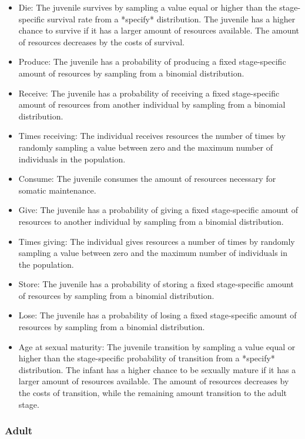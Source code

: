 \documentclass{article}
\begin{document}
\begin{itemize}
    \item Die: The juvenile survives by sampling a value equal or higher than the stage-specific survival rate from a *specify* distribution. The juvenile has a higher chance to survive if it has a larger amount of resources available. The amount of resources decreases by the costs of survival.
    \item Produce: The juvenile has a probability of producing a fixed stage-specific amount of resources by sampling from a binomial distribution.
    \item Receive: The juvenile has a probability of receiving a fixed stage-specific amount of resources from another individual by sampling from a binomial distribution.
    \item Times receiving: The individual receives resources the number of times by randomly sampling a value between zero and the maximum number of individuals in the population.
    \item Consume: The juvenile consumes the amount of resources necessary for somatic maintenance.
    \item Give: The juvenile has a probability of giving a fixed stage-specific amount of resources to another individual by sampling from a binomial distribution.
    \item Times giving: The individual gives resources a number of times by randomly sampling a value between zero and the maximum number of individuals in the population.
    \item Store: The juvenile has a probability of storing a fixed stage-specific amount of resources by sampling from a binomial distribution.
    \item Lose: The juvenile has a probability of losing a fixed stage-specific amount of resources by sampling from a binomial distribution.
    \item Age at sexual maturity: The juvenile transition by sampling a value equal or higher than the stage-specific probability of transition from a *specify* distribution. The infant has a higher chance to be sexually mature if it has a larger amount of resources available. The amount of resources decreases by the costs of transition, while the remaining amount transition to the adult stage.
\end{itemize}

\subsubsection{Adult}
\end{document}
